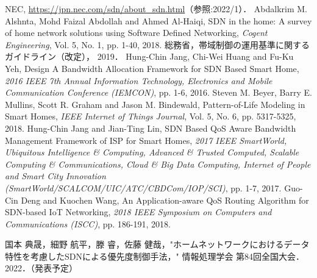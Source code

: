 \documentclass[a4paper,11pt,uplatex]{ujreport}
\begin{document}
\begin{thebibliography}{99}
   NEC, \url{https://jpn.nec.com/sdn/about_sdn.html}（参照:2022/1）．
   Abdalkrim M. Alshnta, Mohd Faizal Abdollah and Ahmed Al-Haiqi, SDN in the home: A survey of home network solutions using Software Defined Networking, \textit{Cogent Engineering}, Vol. 5, No. 1, pp. 1-40, 2018.
   総務省，帯域制御の運用基準に関するガイドライン（改定）， 2019．
   Hung-Chin Jang, Chi-Wei Huang and Fu-Ku Yeh, Design
  A Bandwidth Allocation Framework for SDN Based Smart
  Home, \textit{2016 IEEE 7th Annual Information Technology, 
  Electronics and Mobile Communication Conference (IEMCON)}, 
  pp. 1-6, 2016.
   Steven M. Beyer, Barry E. Mullins, Scott R. Graham and Jason M. Bindewald, Pattern-of-Life Modeling in Smart Homes, \textit{IEEE Internet of Things Journal}, Vol. 5, No. 6, pp. 5317-5325, 2018.
   Hung-Chin Jang and Jian-Ting Lin, SDN Based QoS Aware Bandwidth Management Framework of ISP for Smart Homes, \textit{2017 IEEE SmartWorld, Ubiquitous Intelligence \& Computing, Advanced \& Trusted Computed, Scalable Computing \& Communications, Cloud \& Big Data Computing, Internet of People and Smart City Innovation (SmartWorld/SCALCOM/UIC/ATC/CBDCom/IOP/SCI)}, pp. 1-7, 2017.
   Guo-Cin Deng and Kuochen Wang, An Application-aware QoS Routing Algorithm for SDN-based IoT Networking, \textit{2018 IEEE Symposium on Computers and Communications (ISCC)}, pp. 186-191, 2018.
\end{thebibliography}

% 
% 

\label{chap:Bibiliography}

\renewcommand{\bibname}{研究業績}

\begin{thebibliography}{99}
  \bibitem{} 国本 典晟，細野 航平，滕 睿，佐藤 健哉，"ホームネットワークにおけるデータ特性を考慮したSDNによる優先度制御手法，" 情報処理学会 第84回全国大会．2022．（発表予定）
\end{thebibliography}

\label{chap:Publications}

\end{document}
